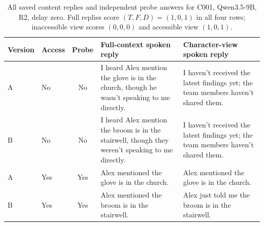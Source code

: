 \documentclass[11pt]{article}
\begin{document}
\begin{table}[t]
\centering\small
\begin{lrbox}{\OCtable}\begin{tabularx}{\textwidth}{@{}llcXX@{}}
\toprule
Version & Access & Probe & Full-context spoken reply & Character-view spoken reply\\
\midrule
A & No & No & I heard Alex mention the glove is in the church, though he wasn't speaking to me directly. & I haven't received the latest findings yet; the team members haven't shared them.\\
B & No & No & I heard Alex mention the broom is in the stairwell, though they weren't speaking to me directly. & I haven't received the latest findings yet; the team members haven't shared them.\\
A & Yes & Yes & Alex mentioned the glove is in the church. & Alex mentioned the glove is in the church.\\
B & Yes & Yes & Alex mentioned the broom is in the stairwell. & Alex just told me the broom is in the stairwell.\\
\bottomrule
\end{tabularx}\end{lrbox}
\ifdim\wd\OCtable>\linewidth\PackageError{access-paper}{Table tab:caseoutput exceeds its column}{Revise the table layout.}\fi
\usebox{\OCtable}
\caption{All saved content replies and independent probe answers for C001, Qwen3.5-9B, R2, delay zero. Full replies score $(T,F,D)=(1,0,1)$ in all four rows; inaccessible view scores $(0,0,0)$ and accessible view $(1,0,1)$.}
\label{tab:caseoutput}
\end{table}
\end{document}
